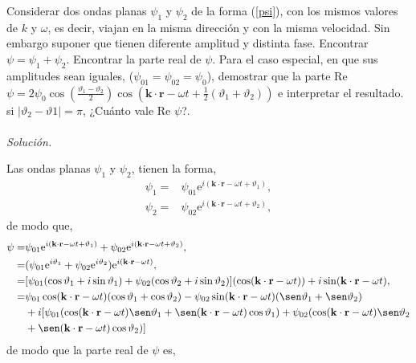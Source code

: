 \documentclass[11pt,fleqn]{book} %
\begin{document}
\begin{example}
Considerar dos ondas planas $\psi_1$ y $\psi_2$ de la forma (\ref{psi}), con los mismos valores de $k$ y $\omega$, es decir, viajan en la misma direcci\'on y con la misma velocidad. Sin embargo suponer que tienen diferente amplitud y distinta fase. Encontrar $\psi=\psi_1+\psi_2$. Encontrar la parte real de $\psi$. Para el caso especial, en que sus amplitudes sean iguales, ($\psi_{01}=\psi_{02}=\psi_{0}$), demostrar que la parte Re $\psi=2\psi_0 \cos\left( \frac{\vartheta_1-\vartheta_2}{2}\right)\cos(\textbf{k}\cdot\textbf{r}-\omega t+\frac{1}{2}(\vartheta_1+\vartheta_2))$ e interpretar el resultado. si $|\vartheta_2-\vartheta1|=\pi$, ¿Cu\'anto vale Re $\psi$?.\\\\

\textit{Soluci\'on.}

Las ondas planas $\psi_1$ y $\psi_2$, tienen la forma,
\begin{equation*}
\begin{split}
\psi_1=&\psi_{01} \text{e}^{i(\textbf{k}\cdot\textbf{r}-\omega t+\vartheta_1)},\\
\psi_2=&\psi_{02} \text{e}^{i(\textbf{k}\cdot\textbf{r}-\omega t+\vartheta_2)},
\end{split}
\end{equation*}
de modo que,
\begin{equation*}
\begin{split}
\psi=&\psi_{01} \text{e}^{i(\textbf{k}\cdot\textbf{r}-\omega t+\vartheta_1)}+\psi_{02} \text{e}^{i(\textbf{k}\cdot\textbf{r}-\omega t+\vartheta_2)},\\
=&(\psi_{01}\text{e}^{i\vartheta_1}+\psi_{02}\text{e}^{i\vartheta_2})\text{e}^{i(\textbf{k}\cdot\textbf{r}-\omega t)},\\
=&[\psi_{01}(\cos \vartheta_1+i\sin \vartheta_1)+\psi_{02}(\cos \vartheta_2+i\sin \vartheta_2)](\cos(\textbf{k}\cdot\textbf{r}-\omega t))+i\sin (\textbf{k}\cdot\textbf{r}-\omega t),\\
=&\psi_{01}\cos(\textbf{k}\cdot\textbf{r}-\omega t)(\cos \vartheta_1+\cos \vartheta_2)-\psi_{02}\sin (\textbf{k}\cdot\textbf{r}-\omega t)(\sen \vartheta_1+\sen \vartheta_2)\\
&+i[\psi_{01}(\cos(\textbf{k}\cdot\textbf{r}-\omega t)\sen \vartheta_1+\sen(\textbf{k}\cdot\textbf{r}-\omega t) \cos \vartheta_1)+\psi_{02}(\cos(\textbf{k}\cdot\textbf{r}-\omega t)\sen \vartheta_2\\
&+\sen(\textbf{k}\cdot\textbf{r}-\omega t) \cos \vartheta_2)]
\end{split}
\end{equation*}
de modo que la parte real de $\psi$ es,


\end{example}
\end{document}
